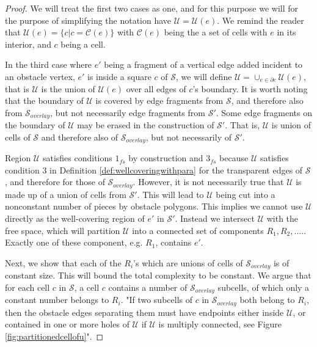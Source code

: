 \begin{proof}
We will treat the first two cases as one, and for this purpose we will for the purpose of 
simplifying the notation have $\mathcal{U}=\mathcal{U}(e)$. We remind the reader 
that $\mathcal{U}(e) = \{c|c=\mathcal{C}(e)\}$ with $\mathcal{C}(e)$ being the a set of 
cells with $e$ in its interior, and $c$ being a cell. 

In the third case where $e'$ being a fragment of a vertical edge added incident to an 
obstacle vertex, $e'$ is inside a square $c$ of $\mathcal{S}$, we will define 
$\mathcal{U}=\cup_{e\in \partial c} \mathcal{U}(e)$, that is $\mathcal{U}$ is the union 
of $\mathcal{U}(e)$ over all edges of $c$'s boundary. It is worth noting that the boundary 
of $\mathcal{U}$ is covered by edge fragments from $\mathcal{S}$, and therefore also from
$\mathcal{S}_{overlay}$, but not necessarily edge fragments from $\mathcal{S}'$. Some edge 
fragments on the boundary of $\mathcal{U}$ may be erased in the construction of $\mathcal{S}'$.
That is, $\mathcal{U}$ is union of cells of $\mathcal{S}$ and therefore also of 
$\mathcal{S}_{overlay}$, but not necessarily of $\mathcal{S}'$. 

Region $\mathcal{U}$ satisfies conditions $1_{fs}$ by construction and $3_{fs}$ because 
$\mathcal{U}$ satisfies condition 3 in Definition \ref{def:wellcoveringwithpara} for 
the transparent edges of $\mathcal{S}$, and therefore for those of $\mathcal{S}_{overlay}$. 
However, it is not necessarily true that $\mathcal{U}$ is made up of a union of cells from 
$\mathcal{S}'$. This will lead to $\mathcal{U}$ being cut into a nonconstant number of pieces 
by obstacle polygons. This implies we cannot use $\mathcal{U}$ directly as the well-covering 
region of $e'$ in $\mathcal{S}'$. Instead we intersect $\mathcal{U}$ with the free space, which 
will partition $\mathcal{U}$ into a connected set of components $R_1,R_2,....$. Exactly one of 
these component, e.g. $R_1$, contains $e'$. 

Next, we show that each of the $R_i$'s which are unions of cells of $\mathcal{S}_{overlay}$ is of 
constant size. This will bound the total complexity to be constant. We argue that for each cell 
$c$ in $\mathcal{S}$, a cell $c$ contains a number of $\mathcal{S}_{overlay}$ subcells, of 
which only a constant number belongs to $R_i$. "If two subcells of $c$ in $\mathcal{S}_{overlay}$
both belong to $R_i$, then the obstacle edges separating them must have endpoints either inside 
$\mathcal{U}$, or contained in one or more holes of $\mathcal{U}$ if $\mathcal{U}$ is multiply 
connected, see Figure \ref{fig:partitionedcellofu}".


\end{proof}
